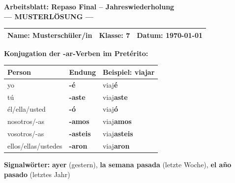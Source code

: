 \documentclass[11pt, a4paper]{article}
\newcommand{\fachfarbe}{spanisch}
\newcommand{\thema}{Repaso Final -- Jahreswiederholung}
\newcommand{\klasse}{7}
\newcommand{\datum}{\today}
\newcommand{\lsg}[1]{\textcolor{loesung}{\textbf{#1}}}
\newcommand{\es}[1]{\textcolor{\fachfarbe}{\textbf{#1}}}
\begin{document}

\begin{center}
    {\Large\bfseries\textcolor{\fachfarbe}{Arbeitsblatt: \thema}}\\[0.3em]
    {\large\textcolor{loesung}{\textbf{--- MUSTERLÖSUNG ---}}}
\end{center}

\vspace{5pt}

\noindent
\begin{tabularx}{\textwidth}{|X|X|X|}
\hline
\textbf{Name:} \lsg{Musterschüler/in} &
\textbf{Klasse:} \klasse &
\textbf{Datum:} \datum \\
\hline
\end{tabularx}

\vspace{10pt}


\begin{merkkasten}
\textbf{Konjugation der -ar-Verben im Pretérito:}

\vspace{0.5em}

\begin{tabular}{|l|l|l|}
\hline
\textbf{Person} & \textbf{Endung} & \textbf{Beispiel: viajar} \\
\hline
yo & \lsg{-é} & viaj\lsg{é} \\
\hline
tú & \lsg{-aste} & viaj\lsg{aste} \\
\hline
él/ella/usted & \lsg{-ó} & viaj\lsg{ó} \\
\hline
nosotros/-as & \lsg{-amos} & viaj\lsg{amos} \\
\hline
vosotros/-as & \lsg{-asteis} & viaj\lsg{asteis} \\
\hline
ellos/ellas/ustedes & \lsg{-aron} & viaj\lsg{aron} \\
\hline
\end{tabular}

\vspace{0.5em}

\textbf{Signalwörter:} \es{ayer} (gestern), \es{la semana pasada} (letzte Woche), \es{el año pasado} (letztes Jahr)
\end{merkkasten}
\end{document}
